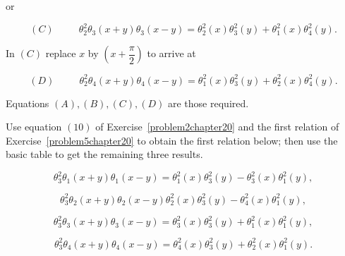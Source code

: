 \begin{solution}
or

$$(C) \hspace{30pt} \theta_2^2\theta_3(x+y) \theta_3(x-y) = \theta_2^2(x) \theta_3^2(y) + \theta_1^2(x) \theta_4^2(y).$$

In $(C)$ replace $x$ by $\left( x + \dfrac{\pi}{2} \right)$ to arrive at

$$(D) \hspace{30pt} \theta_2^2 \theta_4(x+y) \theta_4(x-y) = \theta_1^2(x) \theta_3^2(y) + \theta_2^2(x) \theta_4^2(y).$$

Equations $(A), (B), (C), (D)$ are those required.
\end{solution}
\begin{problem}\label{problem6chapter20}
Use equation $(10)$ of Exercise~\ref{problem2chapter20} and the first relation of Exercise~\ref{problem5chapter20} to obtain the first relation below; then use the basic table to get the remaining three results.

$$\theta_3^2\theta_1(x+y)\theta_1(x-y)=\theta_1^2(x)\theta_3^2(y)-\theta_3^2(x)\theta_1^2(y),$$

$$\theta_3^2\theta_2(x+y)\theta_2(x-y)\theta_2^2(x)\theta_3^2(y) -\theta_4^2(x)\theta_1^2(y),$$

$$\theta_3^2\theta_3(x+y)\theta_3(x-y)=\theta_3^2(x)\theta_3^2(y)+\theta_1^2(x)\theta_1^2(y),$$

$$\theta_3^2\theta_4(x+y)\theta_4(x-y)=\theta_4^2(x)\theta_3^2(y)+\theta_2^2(x)\theta_1^2(y).$$
\end{problem}
